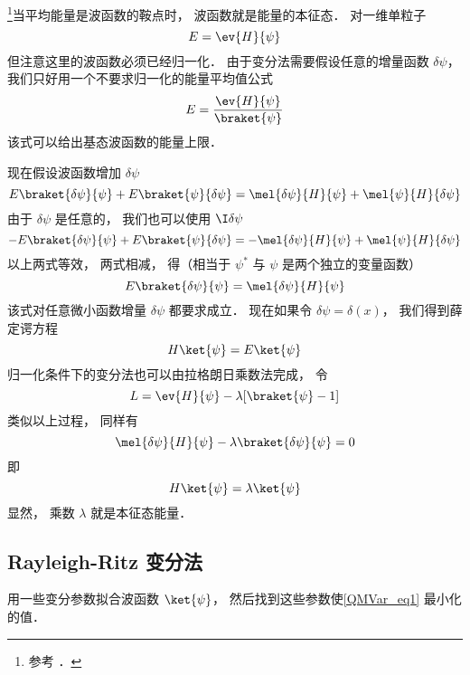 

\footnote{参考 \cite{Brandsen}．}当平均能量是波函数的鞍点时， 波函数就是能量的本征态． 对一维单粒子
\begin{equation}
E = \ev{H}{\psi}
\end{equation}
但注意这里的波函数必须已经归一化． 由于变分法需要假设任意的增量函数 $\delta \psi $，  我们只好用一个不要求归一化的能量平均值公式
\begin{equation}\label{QMVar_eq1}
E = \frac{\ev{H}{\psi}}{\braket{\psi}}
\end{equation}
该式可以给出基态波函数的能量上限．

现在假设波函数增加 $\delta \psi$ 
\begin{equation}
E \braket{\delta\psi}{\psi} + E\braket{\psi}{\delta\psi}
= \mel{\delta \psi}{H}{\psi} + \mel{\psi}{H}{\delta\psi}
\end{equation}
由于 $\delta\psi$ 是任意的， 我们也可以使用 $\I\delta\psi$ 
\begin{equation}
-E \braket{\delta\psi}{\psi} + E \braket{\psi}{\delta\psi}
= -\mel{\delta\psi}{H}{\psi} + \mel{\psi}{H}{\delta\psi}
\end{equation}
以上两式等效， 两式相减， 得（相当于 $\psi^*$ 与 $\psi$ 是两个独立的变量函数）
\begin{equation}
E\braket{\delta\psi}{\psi} = \mel{\delta\psi}{H}{\psi}
\end{equation}
该式对任意微小函数增量 $\delta\psi $ 都要求成立． 现在如果令 $\delta \psi  = \delta (x)$，  我们得到薛定谔方程
\begin{equation}
H \ket{\psi} = E\ket{\psi}
\end{equation}
归一化条件下的变分法也可以由拉格朗日乘数法完成， 令
\begin{equation}
L = \ev{H}{\psi} - \lambda [\braket{\psi} - 1]
\end{equation}
类似以上过程， 同样有
\begin{equation}
\mel{\delta\psi}{H}{\psi} - \lambda\braket{\delta\psi}{\psi} = 0
\end{equation}
即
\begin{equation}
H \ket{\psi} = \lambda \ket{\psi}
\end{equation}
显然， 乘数 $\lambda $ 就是本征态能量．

\subsection{Rayleigh-Ritz 变分法}
用一些变分参数拟合波函数 $\ket{\psi}$， 然后找到这些参数使\autoref{QMVar_eq1} 最小化的值．

